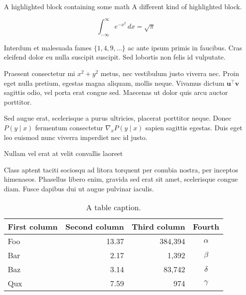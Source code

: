 \documentclass[final]{beamer}
\newlength{\colwidth}
\begin{document}
\begin{frame}[t]
\begin{columns}[t]
\begin{column}{\colwidth}
\begin{exampleblock}{A highlighted block containing some math}
          A different kind of highlighted block.

          $$
          \int_{-\infty}^{\infty} e^{-x^2}\,dx = \sqrt{\pi}
          $$

          Interdum et malesuada fames $\{1, 4, 9, \ldots\}$ ac ante ipsum primis in
          faucibus. Cras eleifend dolor eu nulla suscipit suscipit. Sed lobortis non
          felis id vulputate.


          Praesent consectetur mi $x^2 + y^2$ metus, nec vestibulum justo viverra
          nec. Proin eget nulla pretium, egestas magna aliquam, mollis neque. Vivamus
          dictum $\mathbf{u}^\intercal\mathbf{v}$ sagittis odio, vel porta erat
          congue sed. Maecenas ut dolor quis arcu auctor porttitor.


          Sed augue erat, scelerisque a purus ultricies, placerat porttitor neque.
          Donec $P(y \mid x)$ fermentum consectetur $\nabla_x P(y \mid x)$ sapien
          sagittis egestas. Duis eget leo euismod nunc viverra imperdiet nec id
          justo.

        \end{exampleblock}

        \begin{block}{Nullam vel erat at velit convallis laoreet}

          Class aptent taciti sociosqu ad litora torquent per conubia nostra, per
          inceptos himenaeos. Phasellus libero enim, gravida sed erat sit amet,
          scelerisque congue diam. Fusce dapibus dui ut augue pulvinar iaculis.

          \begin{table}
            \centering
            \begin{tabular}{l r r c}
              \toprule
              \textbf{First column} & \textbf{Second column} & \textbf{Third column} & \textbf{Fourth} \\
              \midrule
              Foo                   & 13.37                  & 384,394               & $\alpha$        \\
              Bar                   & 2.17                   & 1,392                 & $\beta$         \\
              Baz                   & 3.14                   & 83,742                & $\delta$        \\
              Qux                   & 7.59                   & 974                   & $\gamma$        \\
              \bottomrule
            \end{tabular}
            \caption{A table caption.}
          \end{table}


\end{block}
\end{column}
\end{columns}
\end{frame}
\end{document}
